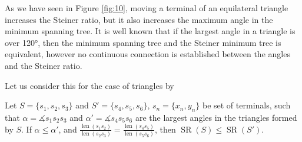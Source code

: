 \documentclass{mpaper}
\begin{document}
As we have seen in Figure \ref{fig:10}, moving a terminal of an equilateral triangle increases the Steiner ratio, but it also increases the maximum angle in the minimum spanning tree. It is well known that if the largest angle in a triangle is over 120°, then the minimum spanning tree and the Steiner minimum tree is equivalent, however no  continuous connection is established between the angles and the Steiner ratio.

Let us consider this for the case of triangles by 
\begin{lemma}
  Let $S=\{s_1, s_2, s_3\}$ and $S'=\{s_4, s_5, s_6\}$, $s_n=\{x_n, y_n\}$ be set of terminals, such that  $\alpha=\measuredangle s_1s_2s_3$ and $\alpha'=\measuredangle s_4s_5s_6$ are the largest angles in the triangles formed by $S$.
   If
  $\alpha\allowbreak\leq\alpha'$,
  and $\allowbreak\frac{\operatorname{len}(s_1s_2)}{\operatorname{len}(s_2s_3)}\allowbreak=\allowbreak\frac{\operatorname{len}(s_4s_5)}{\operatorname{len}(s_5s_6)}$,
   then $\operatorname{SR}(S) \allowbreak\leq\allowbreak \operatorname{SR}(S')$.
\end{lemma}
\end{document}
